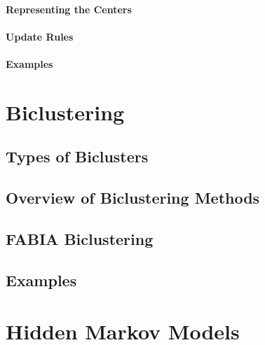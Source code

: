 \documentclass[11pt, oneside]{book}
\begin{document}

\subsubsection{Representing the Centers}


\subsubsection{Update Rules}


\subsubsection{Examples}



\chapter{Biclustering}

\section{Types of Biclusters}


\section{Overview of Biclustering Methods}


\section{FABIA Biclustering}


\section{Examples}



\chapter{Hidden Markov Models}
\end{document}
